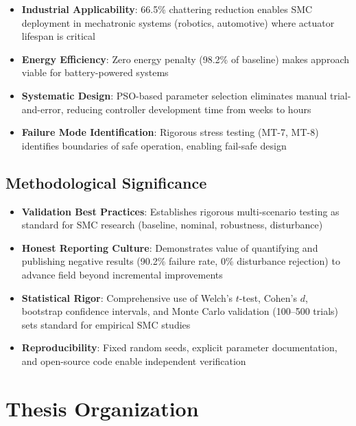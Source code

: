 \begin{itemize}
    \item \textbf{Industrial Applicability}: 66.5\% chattering reduction enables SMC deployment in mechatronic systems (robotics, automotive) where actuator lifespan is critical

    \item \textbf{Energy Efficiency}: Zero energy penalty (98.2\% of baseline) makes approach viable for battery-powered systems

    \item \textbf{Systematic Design}: PSO-based parameter selection eliminates manual trial-and-error, reducing controller development time from weeks to hours

    \item \textbf{Failure Mode Identification}: Rigorous stress testing (MT-7, MT-8) identifies boundaries of safe operation, enabling fail-safe design
\end{itemize}

\subsection{Methodological Significance}

\begin{itemize}
    \item \textbf{Validation Best Practices}: Establishes rigorous multi-scenario testing as standard for SMC research (baseline, nominal, robustness, disturbance)

    \item \textbf{Honest Reporting Culture}: Demonstrates value of quantifying and publishing negative results (90.2\% failure rate, 0\% disturbance rejection) to advance field beyond incremental improvements

    \item \textbf{Statistical Rigor}: Comprehensive use of Welch's $t$-test, Cohen's $d$, bootstrap confidence intervals, and Monte Carlo validation (100--500 trials) sets standard for empirical SMC studies

    \item \textbf{Reproducibility}: Fixed random seeds, explicit parameter documentation, and open-source code enable independent verification
\end{itemize}

\section{Thesis Organization}
\label{sec:organization}

